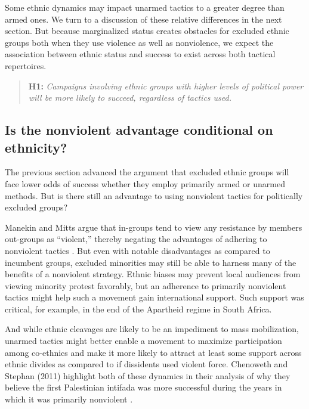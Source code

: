 \documentclass[
  letterpaper,
  DIV=11,
  numbers=noendperiod]{scrartcl}
\begin{document}
Some ethnic dynamics may impact unarmed tactics to a greater degree than
armed ones. We turn to a discussion of these relative differences in the
next section. But because marginalized status creates obstacles for
excluded ethnic groups both when they use violence as well as
nonviolence, we expect the association between ethnic status and success
to exist across both tactical repertoires.

\begin{quote}
\textbf{H1:} \emph{Campaigns involving ethnic groups with higher levels
of political power will be more likely to succeed, regardless of tactics
used.}
\end{quote}

\subsection{\texorpdfstring{\textbf{Is the nonviolent advantage
conditional on
ethnicity?}}{Is the nonviolent advantage conditional on ethnicity?}}\label{is-the-nonviolent-advantage-conditional-on-ethnicity}

The previous section advanced the argument that excluded ethnic groups
will face lower odds of success whether they employ primarily armed or
unarmed methods. But is there still an advantage to using nonviolent
tactics for politically excluded groups?

Manekin and Mitts argue that in-groups tend to view any resistance by
members out-groups as ``violent,'' thereby negating the advantages of
adhering to nonviolent tactics \autocite[162]{Manekin2022}. But even
with notable disadvantages as compared to incumbent groups, excluded
minorities may still be able to harness many of the benefits of a
nonviolent strategy. Ethnic biases may prevent local audiences from
viewing minority protest favorably, but an adherence to primarily
nonviolent tactics might help such a movement gain international
support. Such support was critical, for example, in the end of the
Apartheid regime in South Africa.

And while ethnic cleavages are likely to be an impediment to mass
mobilization, unarmed tactics might better enable a movement to maximize
participation among co-ethnics and make it more likely to attract at
least some support across ethnic divides as compared to if dissidents
used violent force. Chenoweth and Stephan (2011) highlight both of these
dynamics in their analysis of why they believe the first Palestinian
intifada was more successful during the years in which it was primarily
nonviolent .
\end{document}
